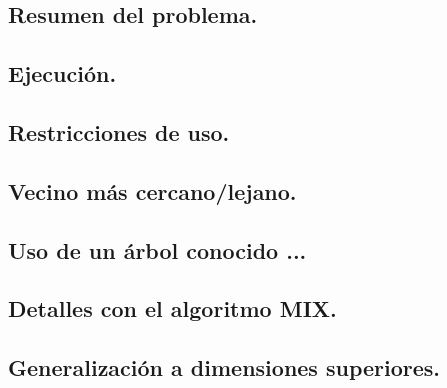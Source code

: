 \documentclass[9pt]{beamer}
\begin{document}
\Front
\overview
\subsection{Resumen del problema.}

\subsection{Ejecución.}

\subsection{Restricciones de uso.}

\subsection{Vecino más cercano/lejano.}

\subsection{Uso de un árbol conocido ...}

\subsection{Detalles con el algoritmo MIX.}
\subsection{Generalización a dimensiones superiores.}
\pagestyle{empty}

\end{document}
